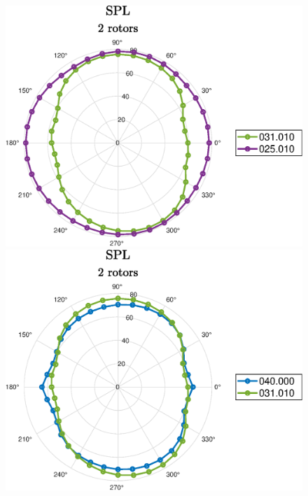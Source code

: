 \begin{frame}{\subsecname}
\begin{figure} [H]  
	\centering
	\subfloat
	{\includegraphics[scale=0.35]{Photos/spl_2rot_031010_025010.eps}}
	\subfloat
	{\includegraphics[scale=0.35]{Photos/spl_2rot_040000_031010.eps}
  }
\end{figure} 

\end{frame}

